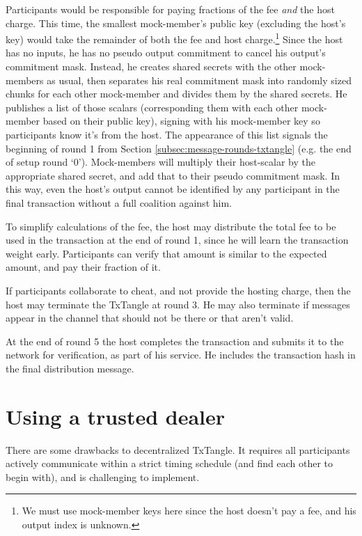 Participants would be responsible for paying fractions of the fee {\em and} the host charge. This time, the smallest mock-member's public key (excluding the host's key) would take the remainder of both the fee and host charge.\footnote{We must use mock-member keys here since the host doesn't pay a fee, and his output index is unknown.} Since the host has no inputs, he has no pseudo output commitment to cancel his output's commitment mask. Instead, he creates shared secrets with the other mock-members as usual, then separates his real commitment mask into randomly sized chunks for each other mock-member and divides them by the shared secrets. He publishes a list of those scalars (corresponding them with each other mock-member based on their public key), signing with his mock-member key so participants know it's from the host. The appearance of this list signals the beginning of round 1 from Section \ref{subsec:message-rounds-txtangle} (e.g. the end of setup round `0'). Mock-members will multiply their host-scalar by the appropriate shared secret, and add that to their pseudo commitment mask. In this way, even the host's output cannot be identified by any participant in the final transaction without a full coalition against him.

To simplify calculations of the fee, the host may distribute the total fee to be used in the transaction at the end of round 1, since he will learn the transaction weight early. Participants can verify that amount is similar to the expected amount, and pay their fraction of it.

If participants collaborate to cheat, and not provide the hosting charge, then the host may terminate the TxTangle at round 3. He may also terminate if messages appear in the channel that should not be there or that aren't valid.

At the end of round 5 the host completes the transaction and submits it to the network for verification, as part of his service. He includes the transaction hash in the final distribution message.



\section{Using a trusted dealer}
\label{sec:dealer-txtangle}

There are some drawbacks to decentralized TxTangle. It requires all participants actively communicate within a strict timing schedule (and find each other to begin with), and is challenging to implement.

